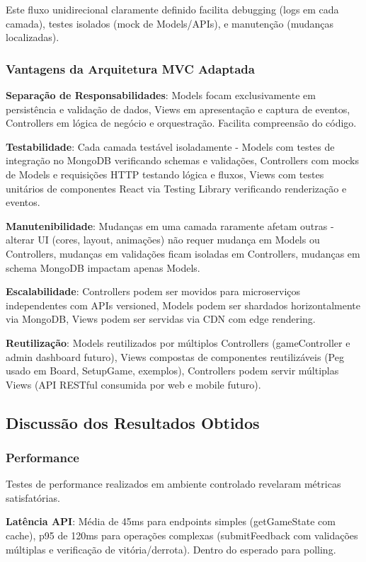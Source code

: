 \documentclass[conference]{IEEEtran}
\begin{document}
Este fluxo unidirecional claramente definido facilita debugging (logs em cada camada), testes isolados (mock de Models/APIs), e manutenção (mudanças localizadas).

\subsubsection{Vantagens da Arquitetura MVC Adaptada}

\textbf{Separação de Responsabilidades}: Models focam exclusivamente em persistência e validação de dados, Views em apresentação e captura de eventos, Controllers em lógica de negócio e orquestração. Facilita compreensão do código.

\textbf{Testabilidade}: Cada camada testável isoladamente - Models com testes de integração no MongoDB verificando schemas e validações, Controllers com mocks de Models e requisições HTTP testando lógica e fluxos, Views com testes unitários de componentes React via Testing Library verificando renderização e eventos.

\textbf{Manutenibilidade}: Mudanças em uma camada raramente afetam outras - alterar UI (cores, layout, animações) não requer mudança em Models ou Controllers, mudanças em validações ficam isoladas em Controllers, mudanças em schema MongoDB impactam apenas Models.

\textbf{Escalabilidade}: Controllers podem ser movidos para microserviços independentes com APIs versioned, Models podem ser shardados horizontalmente via MongoDB, Views podem ser servidas via CDN com edge rendering.

\textbf{Reutilização}: Models reutilizados por múltiplos Controllers (gameController e admin dashboard futuro), Views compostas de componentes reutilizáveis (Peg usado em Board, SetupGame, exemplos), Controllers podem servir múltiplas Views (API RESTful consumida por web e mobile futuro).

\subsection{Discussão dos Resultados Obtidos}

\subsubsection{Performance}

Testes de performance realizados em ambiente controlado revelaram métricas satisfatórias.

\textbf{Latência API}: Média de 45ms para endpoints simples (getGameState com cache), p95 de 120ms para operações complexas (submitFeedback com validações múltiplas e verificação de vitória/derrota). Dentro do esperado para polling.
\end{document}

